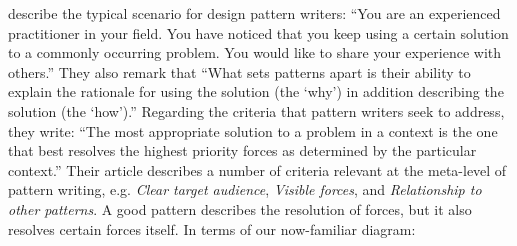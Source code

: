  describe the typical scenario for design
pattern writers: ``You are an experienced practitioner in your
field. You have noticed that you keep using a certain solution to a
commonly occurring problem. You would like to share your experience
with others.''  They also remark that ``What sets patterns apart is
their ability to explain the rationale for using the solution (the
`why') in addition describing the solution (the `how').''  Regarding
the criteria that pattern writers seek to address, they write: ``The
most appropriate solution to a problem in a context is the one that
best resolves the highest priority forces as determined by the
particular context.''  Their article describes a number of criteria
relevant at the meta-level of pattern writing, e.g. \emph{Clear target
  audience}, \emph{Visible forces}, and \emph{Relationship to other
  patterns}.  A good pattern describes the resolution of forces, but
it also resolves certain forces itself.  In terms of our now-familiar
diagram:

%

